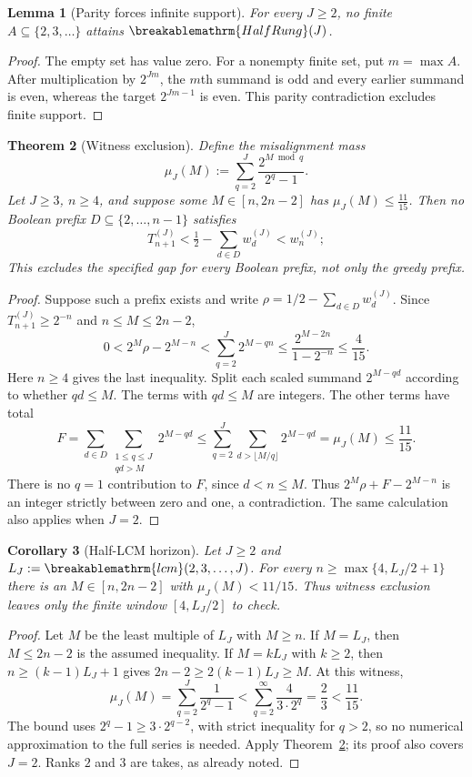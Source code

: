 \documentclass[11pt]{article}
\theoremstyle{plain}
\newtheorem{thm}{Theorem}[section]
\newtheorem{lem}[thm]{Lemma}
\newtheorem{cor}[thm]{Corollary}
\theoremstyle{definition}
\theoremstyle{remark}
\renewcommand{\mathrm}[1]{\ifmmode\breakablemathrm{#1}\else\textrm{#1}\fi}%
\begin{document}
\begin{lem}[Parity forces infinite support]
\label{lem:tr-parity}
For every $J\ge2$, no finite $A\subseteq\{2,3,\ldots\}$ attains
$\mathrm{HalfRung}(J)$.
\end{lem}
\begin{proof}
The empty set has value zero.  For a nonempty finite set, put $m=\max A$.
After multiplication by $2^{Jm}$, the $m$th summand is odd and every earlier
summand is even, whereas the target $2^{Jm-1}$ is even.  This parity
contradiction excludes finite support.
\end{proof}

\begin{thm}[Witness exclusion]
\label{thm:tr-witness-exclusion}
Define the misalignment mass
$$\mu_J(M):=\sum_{q=2}^{J}\frac{2^{M\bmod q}}{2^q-1}.$$
Let $J\ge3$, $n\ge4$, and suppose some $M\in[n,2n-2]$ has $\mu_J(M)\le\tfrac{11}{15}$. Then no
Boolean prefix $D\subseteq\{2,\ldots,n-1\}$ satisfies
$$T_{n+1}^{(J)}<\tfrac12-\sum_{d\in D}w_d^{(J)}<w_n^{(J)};$$
This excludes the specified gap for every Boolean prefix, not only the
greedy prefix.
\end{thm}
\begin{proof}
Suppose such a prefix exists and write
$\rho=1/2-\sum_{d\in D}w_d^{(J)}$.  Since
$T_{n+1}^{(J)}\ge2^{-n}$ and $n\le M\le2n-2$,
\[
 0<2^M\rho-2^{M-n}
   <\sum_{q=2}^{J}2^{M-qn}
   \le\frac{2^{M-2n}}{1-2^{-n}}\le\frac4{15}.
\]
Here $n\ge4$ gives the last inequality.  Split each scaled summand
$2^{M-qd}$ according to whether $qd\le M$.  The terms with
$qd\le M$ are integers.  The other terms have total
\[
 F=\sum_{d\in D}\sum_{\substack{1\le q\le J\\qd>M}}2^{M-qd}
 \le\sum_{q=2}^{J}\sum_{d>\lfloor M/q\rfloor}2^{M-qd}
 =\mu_J(M)\le\frac{11}{15}.
\]
There is no $q=1$ contribution to $F$, since $d<n\le M$.
Thus $2^M\rho+F-2^{M-n}$ is an integer strictly between zero and one,
a contradiction.  The same calculation also applies when $J=2$.
\end{proof}

\begin{cor}[Half-LCM horizon]
\label{cor:tr-half-lcm}
Let $J\ge2$ and $L_J:=\mathrm{lcm}(2,3,\ldots,J)$.  For every
$n\ge\max\{4,L_J/2+1\}$ there is an $M\in[n,2n-2]$ with
$\mu_J(M)<11/15$.  Thus witness exclusion leaves only the finite
window $[4,L_J/2]$ to check.
\end{cor}
\begin{proof}
Let $M$ be the least multiple of $L_J$ with $M\ge n$.
If $M=L_J$, then $M\le2n-2$ is the assumed inequality.
If $M=kL_J$ with $k\ge2$, then $n\ge(k-1)L_J+1$ gives
$2n-2\ge2(k-1)L_J\ge M$.  At this witness,
\[
 \mu_J(M)=\sum_{q=2}^{J}\frac1{2^q-1}
 <\sum_{q=2}^{\infty}\frac{4}{3\cdot2^q}
 =\frac23<\frac{11}{15}.
\]
The bound uses $2^q-1\ge3\cdot2^{q-2}$, with strict inequality for
$q>2$, so no numerical approximation to the full series is needed.
Apply Theorem~\ref{thm:tr-witness-exclusion}; its proof also covers
$J=2$.  Ranks $2$ and $3$ are takes, as already noted.
\end{proof}
\end{document}
